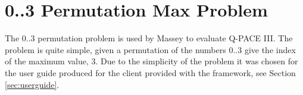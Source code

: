 % 




\section{0..3 Permutation Max Problem}
\label{sec:maxproblemexp}

The $0..3$ permutation problem is used by Massey\cite{masseythesis} to evaluate Q-PACE III.
The problem is quite simple, given a permutation of the numbers $0..3$ give the index of the maximum value, $3$.
Due to the simplicity of the problem it was chosen for the user guide produced for the client provided with the framework, see Section \ref{sec:userguide}.

